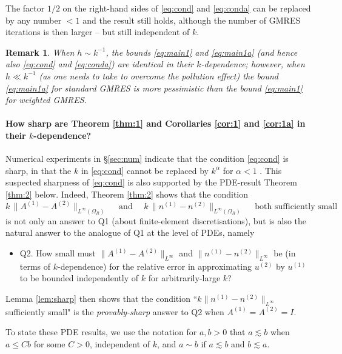 \documentclass[10pt]{article}%
\newtheorem{remark}[theorem]{Remark}
\numberwithin{equation}{section}
\newcommand{\beq}{\begin{equation}}
\newcommand{\eeq}{\end{equation}}
\newcommand{\beqs}{\begin{equation*}}
\newcommand{\eeqs}{\end{equation*}}
\newcommand{\bit}{\begin{itemize}}
\newcommand{\eit}{\end{itemize}}
\newcommand{\bre}{\begin{remark}}
\newcommand{\ere}{\end{remark}}
\newcommand{\gv}{\nabla v}
\newcommand{\HoDkk}{{H^1_{k}(\domain_R)}}
\newcommand*{\N}[1]{\left\|#1\right\|}
\newcommand{\tfor}{\text{ for }}
\newcommand{\domain}{\Omega}
\newcommand{\coeffAo}{A^{(1)}}
\newcommand{\coeffAt}{A^{(2)}}
\newcommand{\coeffno}{n^{(1)}}
\newcommand{\coeffnt}{n^{(2)}}
\begin{document}
The factor $1/2$ on the right-hand sides of \eqref{eq:cond} and \eqref{eq:conda} can be replaced by any number $<1$ and the result still holds, although the number of GMRES iterations is then larger -- but still independent of $k$.

\bre
When $h\sim  k^{-1}$, the bounds \eqref{eq:main1} and \eqref{eq:main1a} (and hence also \eqref{eq:cond} and \eqref{eq:conda}) are identical in their $k$-dependence; however, when $h\ll k^{-1}$ (as one needs to take to overcome the pollution effect) the bound \eqref{eq:main1a} for standard GMRES is more pessimistic than the bound \eqref{eq:main1} for weighted GMRES.
\ere


\paragraph{How sharp are Theorem \ref{thm:1} and Corollaries \ref{cor:1} and \ref{cor:1a} in their $k$-dependence?}
Numerical experiments in \S\ref{sec:num} indicate that the condition \eqref{eq:cond} is sharp, in that the $k$ in \eqref{eq:cond} cannot be replaced by $k^\alpha$ for $\alpha<1$ . This suspected sharpness of \eqref{eq:cond} is also supported by the PDE-result Theorem \ref{thm:2} below. Indeed, Theorem \ref{thm:2} %
 shows that the condition
\beqs
k\,
\big\|\coeffAo-\coeffAt\big\|_{L^\infty(\Omega_R)} \quad\text{ and } \quad k\,\big\|\coeffno-\coeffnt\big\|_{L^\infty(\Omega_R)}
\quad\text{ both sufficiently small}
\eeqs
is not only an answer to Q1 (about finite-element discretisations), but is also the natural answer to the analogue of Q1 at the level of PDEs, namely 
\bit
\item[Q2.]
How small must $\|\coeffAo - \coeffAt\|_{L^\infty}$ and 
$\|\coeffno - \coeffnt\|_{L^\infty}$ be (in terms of $k$-dependence) for the relative error in approximating 
$u^{(2)}$ by $u^{(1)}$ to be bounded independently of $k$ for arbitrarily-large $k$? 
\eit
Lemma \ref{lem:sharp} then shows that the condition ``$k\|\coeffno - \coeffnt\|_{L^\infty}$ sufficiently small" is the \emph{provably-sharp} answer to Q2 when $\coeffAo= \coeffAt= I$.

To state these PDE results, we use the notation for $a,b>0$ that $a\lesssim b$ when $a\leq C b$ for some $C>0$, independent of $k$, and $a\sim b$ if $a\lesssim b$ and $b\lesssim a$.
\end{document}
